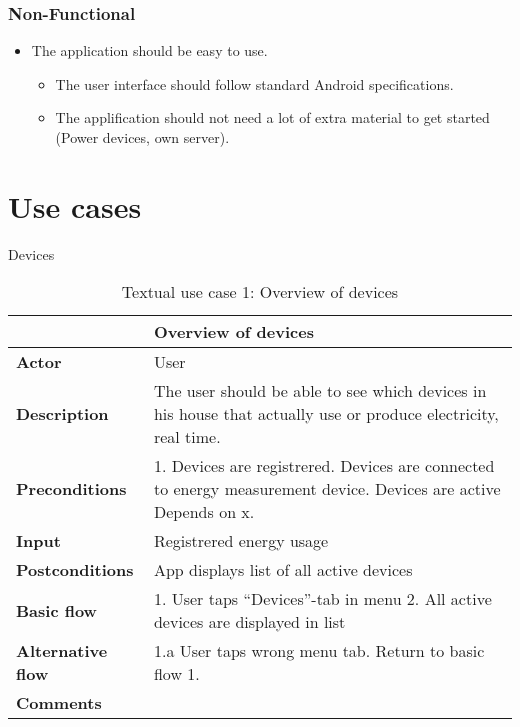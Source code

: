 \subsubsection{Non-Functional}

\begin{itemize}
\item The application should be easy to use.
\begin{itemize}
\item The user interface should follow standard Android specifications. 
\item The applification should not need a lot of extra material to get started (Power devices, own server).
\end{itemize}
\end{itemize}

\section{Use cases}
Devices

\begin{table}[H]
\begin{tabular}{|l|p{12cm}|}
\hline
&\textbf{Overview of devices}\\\hline
\textbf{Actor} &User\\\hline
\textbf{Description}&
The user should be able to see which devices in his house that actually use or produce electricity, real time.\\\hline
\textbf{Preconditions}&
1. Devices are registrered\newline
2. Devices are connected to energy measurement device\newline
3. Devices are active\newline
Depends on x.\\\hline
\textbf{Input}&
Registrered energy usage\\\hline
\textbf{Postconditions}& App displays list of all active devices\\\hline
\textbf{Basic flow}&
1. User taps “Devices”-tab in menu
2. All active devices are displayed in list\\\hline
\textbf{Alternative flow}&
1.a User taps wrong menu tab. Return to basic flow 1.\\\hline
\textbf{Comments}&\\\hline
\end{tabular}
\caption{Textual use case 1: Overview of devices}
\end{table}


